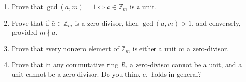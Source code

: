   \begin{exercise}[Shifrin 1.4.5.a/b/c]
    \begin{enumerate}
      \item Prove that $\gcd(a, m) = 1 \iff \bar{a} \in \mathbb{Z}_m$ is a unit.
      \item Prove that if $\bar{a} \in \mathbb{Z}_m$ is a zero-divisor, then $\gcd(a, m) > 1$, and conversely, provided $m \nmid a$.
      \item Prove that every nonzero element of $\mathbb{Z}_m$ is either a unit or a zero-divisor.
      \item Prove that in any commutative ring $R$, a zero-divisor cannot be a unit, and a unit cannot be a zero-divisor. Do you think c.\ holds in general?
    \end{enumerate}
  \end{exercise}
